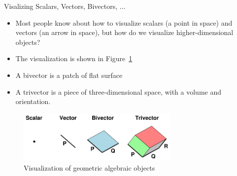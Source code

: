 \documentclass[aspectratio=169,xcolor=dvipsnames]{beamer}
\begin{document}




\begin{frame}{Visalizing Scalars, Vectors, Bivectors, $\ldots$}
\begin{itemize}
\item Most people know about how to visualize scalars (a point in space) and
      vectors (an arrow in space), but how do we visualize higher-dimensional objects?
\item The visualization is shown in Figure~\ref{Fig:ObjViz}
\item A bivector is a patch of flat surface
\item A trivector is a piece of three-dimensional space, with a volume and orientation.
\end{itemize}

\begin{figure}
      \includegraphics[width=0.7\textwidth]{Figs/blades.png}
      \caption{Visualization of geometric algebraic objects}\label{Fig:ObjViz}
\end{figure}

\end{frame}

\end{document}
